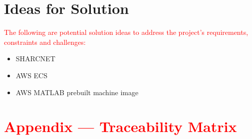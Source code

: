 \documentclass[12pt]{article}
\begin{document}
\section{Ideas for Solution}
\textcolor{red}{The following are potential solution ideas to address the project’s requirements, constraints and challenges:}
\begin{itemize}
    \item SHARCNET
    \item AWS ECS
    \item AWS MATLAB prebuilt machine image
\end{itemize}

\newpage{}
\section{\textcolor{red}{Appendix --- Traceability Matrix}}
\end{document}
